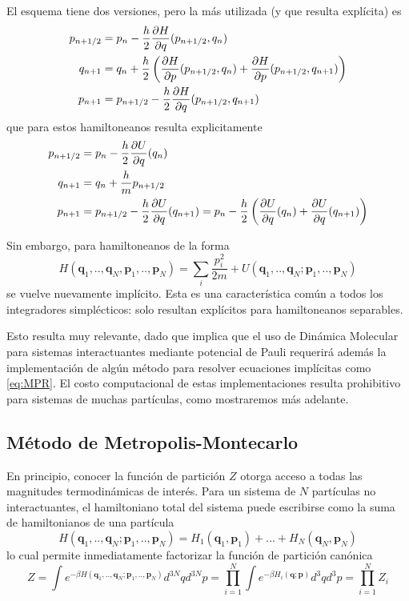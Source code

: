 El esquema tiene dos versiones, pero la más utilizada (y que resulta explícita) es
\begin{align*}
 p_{n+1/2} &= p_n - \frac{h}{2}\frac{\partial H}{\partial q}(p_{n+1/2}, q_n) \\
 q_{n+1} &= q_n + \frac{h}{2}\left( \frac{\partial H}{\partial p}(p_{n+1/2}, q_n) + \frac{\partial H}{\partial p}(p_{n+1/2}, q_{n+1}) \right) \\
 p_{n+1} &= p_{n+1/2} - \frac{h}{2}\frac{\partial H}{\partial q}(p_{n+1/2}, q_{n+1})
\end{align*}
que para estos hamiltoneanos resulta explicitamente
\begin{align*}
 p_{n+1/2} &= p_n - \frac{h}{2}\frac{\partial U}{\partial q}(q_n) \\
 q_{n+1} &= q_n + \frac{h}{m}p_{n+1/2} \\
 p_{n+1} &= p_{n+1/2} - \frac{h}{2}\frac{\partial U}{\partial q}(q_{n+1}) = p_n - \frac{h}{2} \left( \frac{\partial U}{\partial q}(q_n) + \frac{\partial U}{\partial q}(q_{n+1}) \right)
\end{align*}

Sin embargo, para hamiltoneanos de la forma
\[ H(\mathbf{q}_1,..,\mathbf{q}_N,\mathbf{p}_1,..,\mathbf{p}_N) = \sum_i \frac{p_i^2}{2m} + U(\mathbf{q}_1,..,\mathbf{q}_N;\mathbf{p}_1,..,\mathbf{p}_N)\]
se vuelve nuevamente implícito.
Esta es una característica común a todos los integradores simplécticos: solo resultan explícitos para hamiltoneanos separables.

Esto resulta muy relevante, dado que implica que el uso de Dinámica Molecular para sistemas interactuantes mediante potencial de Pauli requerirá además la implementación
de algún método para resolver ecuaciones implícitas como \eqref{eq:MPR}.
El costo computacional de estas implementaciones resulta prohibitivo para sistemas de muchas partículas, como mostraremos más adelante.



\subsection{Método de Metropolis-Montecarlo}

En principio, conocer la función de partición $Z$ otorga acceso a todas las magnitudes termodinámicas de interés.
Para un sistema de $N$ partículas no interactuantes, el hamiltoniano total del sistema puede escribirse como la suma de hamiltonianos de una partícula
\[H(\mathbf{q}_1,..,\mathbf{q}_N;\mathbf{p}_1,..,\mathbf{p}_N) = H_1(\mathbf{q}_1, \mathbf{p}_1) + ... +H_N(\mathbf{q}_N, \mathbf{p}_N)\]
lo cual permite inmediatamente factorizar la función de partición canónica
\[ Z = \int e^{-\beta H(\mathbf{q}_1,..,\mathbf{q}_N;\mathbf{p}_1,..,\mathbf{p}_N)} d^{3N}qd^{3N}p = \prod_{i=1}^N \int e^{-\beta H_i(\mathbf{q};\mathbf{p})} d^{3}qd^{3}p = \prod_{i=1}^N Z_i \]

